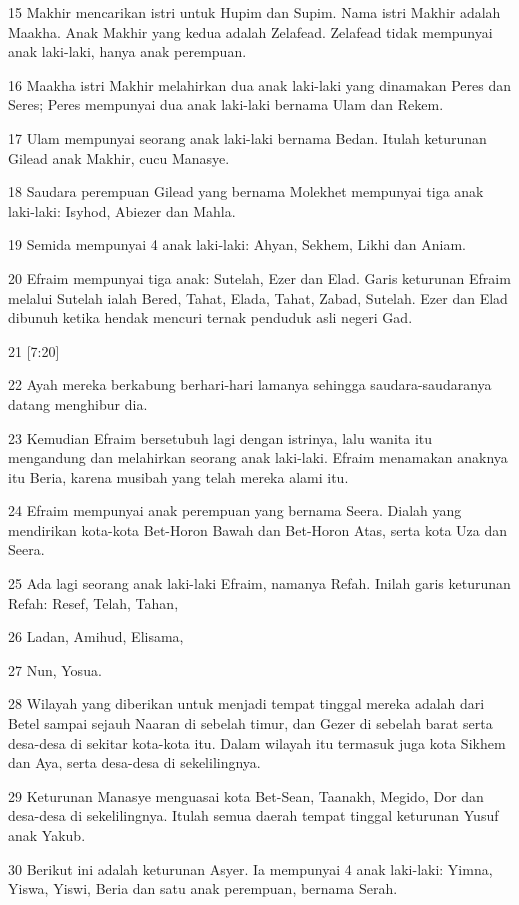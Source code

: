 \par 15 Makhir mencarikan istri untuk Hupim dan Supim. Nama istri Makhir adalah Maakha. Anak Makhir yang kedua adalah Zelafead. Zelafead tidak mempunyai anak laki-laki, hanya anak perempuan.
\par 16 Maakha istri Makhir melahirkan dua anak laki-laki yang dinamakan Peres dan Seres; Peres mempunyai dua anak laki-laki bernama Ulam dan Rekem.
\par 17 Ulam mempunyai seorang anak laki-laki bernama Bedan. Itulah keturunan Gilead anak Makhir, cucu Manasye.
\par 18 Saudara perempuan Gilead yang bernama Molekhet mempunyai tiga anak laki-laki: Isyhod, Abiezer dan Mahla.
\par 19 Semida mempunyai 4 anak laki-laki: Ahyan, Sekhem, Likhi dan Aniam.
\par 20 Efraim mempunyai tiga anak: Sutelah, Ezer dan Elad. Garis keturunan Efraim melalui Sutelah ialah Bered, Tahat, Elada, Tahat, Zabad, Sutelah. Ezer dan Elad dibunuh ketika hendak mencuri ternak penduduk asli negeri Gad.
\par 21 [7:20]
\par 22 Ayah mereka berkabung berhari-hari lamanya sehingga saudara-saudaranya datang menghibur dia.
\par 23 Kemudian Efraim bersetubuh lagi dengan istrinya, lalu wanita itu mengandung dan melahirkan seorang anak laki-laki. Efraim menamakan anaknya itu Beria, karena musibah yang telah mereka alami itu.
\par 24 Efraim mempunyai anak perempuan yang bernama Seera. Dialah yang mendirikan kota-kota Bet-Horon Bawah dan Bet-Horon Atas, serta kota Uza dan Seera.
\par 25 Ada lagi seorang anak laki-laki Efraim, namanya Refah. Inilah garis keturunan Refah: Resef, Telah, Tahan,
\par 26 Ladan, Amihud, Elisama,
\par 27 Nun, Yosua.
\par 28 Wilayah yang diberikan untuk menjadi tempat tinggal mereka adalah dari Betel sampai sejauh Naaran di sebelah timur, dan Gezer di sebelah barat serta desa-desa di sekitar kota-kota itu. Dalam wilayah itu termasuk juga kota Sikhem dan Aya, serta desa-desa di sekelilingnya.
\par 29 Keturunan Manasye menguasai kota Bet-Sean, Taanakh, Megido, Dor dan desa-desa di sekelilingnya. Itulah semua daerah tempat tinggal keturunan Yusuf anak Yakub.
\par 30 Berikut ini adalah keturunan Asyer. Ia mempunyai 4 anak laki-laki: Yimna, Yiswa, Yiswi, Beria dan satu anak perempuan, bernama Serah.
